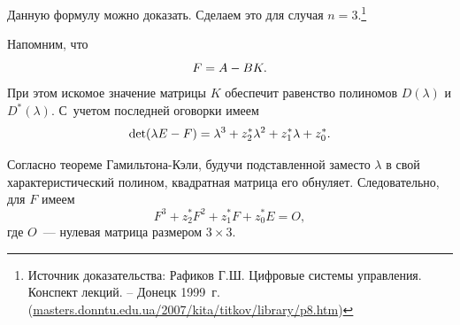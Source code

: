 \documentclass[12pt,a4paper,openany]{extarticle}
\begin{document}
Данную формулу можно доказать.
Сделаем это для случая $n=3$\lefteqn.\footnote{Источник доказательства:
Рафиков Г.Ш. Цифровые системы управления. Конспект лекций. – Донецк 1999~г. (\url{masters.donntu.edu.ua/2007/kita/titkov/library/p8.htm})}

Напомним, что
\begin{equation}\label{H=A-BK}
	F = A-BK\ldotp
\end{equation}
При этом искомое значение матрицы $K$ обеспечит равенство полиномов $D(\lambda)$ и $D^*(\lambda)$.
С~учетом последней оговорки имеем
\begin{equation}
	\det(\lambda E - F) = \lambda^3 + z^*_{2}\lambda^{2} + z^*_1\lambda + z^*_0\ldotp
\end{equation}

Согласно теореме Гамильтона-Кэли, будучи подставленной заместо $\lambda$ в свой характеристический полином, квадратная матрица его обнуляет. Следовательно, для $F$ имеем
\begin{equation}\label{H_in_har}
	F^3 + z^*_{2}F^{2} + z^*_1F + z^*_0E = O,
\end{equation}
где $O$~--- нулевая матрица размером $3\times3$.
\end{document}
